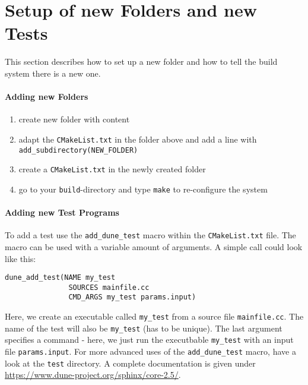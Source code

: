 \section{Setup of new Folders and new Tests}
\label{sc_newfoldersetup}
This section describes how to set up a new folder and how to tell
the build system there is a new one.
\paragraph{Adding new Folders}
\begin{enumerate}[1)]
 \item create new folder with content
 \item adapt the \verb+CMakeList.txt+ in the folder above and add a line with
       \verb+add_subdirectory(NEW_FOLDER)+
 \item create a \verb+CMakeList.txt+ in the newly created folder
 \item go to your \texttt{build}-directory and type \verb+make+ to
       re-configure the system
\end{enumerate}

\paragraph{Adding new Test Programs}
\noindent To add a test use the \texttt{add\_dune\_test} macro within the \texttt{CMakeList.txt} file.
The macro can be used with a variable amount of arguments. A simple call could look like this:

\begin{lstlisting}[style=DumuxCode]
dune_add_test(NAME my_test
               SOURCES mainfile.cc
               CMD_ARGS my_test params.input)
\end{lstlisting}

Here, we create an executable called \texttt{my\_test} from a source file \texttt{mainfile.cc}.
The name of the test will also be \texttt{my\_test} (has to be unique). The last argument specifies a command - here, we just run the executbable \texttt{my\_test} with an input file \texttt{params.input}. For more advanced uses of
the \texttt{add\_dune\_test} macro, have a look at the \texttt{test} directory. A complete documentation is given under \url{https://www.dune-project.org/sphinx/core-2.5/}.
